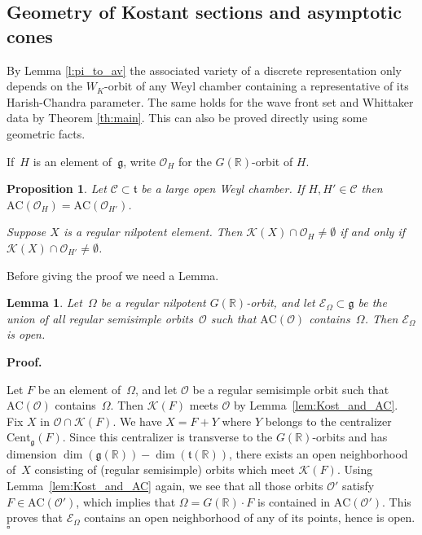 \documentclass[10pt,leqno]{article}
\newtheorem{lemma}[equation]{Lemma}
\newtheorem{proposition}[equation]{Proposition}
\numberwithin{equation}{section}
\newcommand{\qed}{\hfill $\square$ \medskip}
\newenvironment{proof}[1][Proof]{\noindent\textbf{#1.} }{\qed}
\renewcommand{\O}{\mathcal O}
\newcommand{\R}{\mathbb R}
\newcommand{\K}{\mathcal K}
\renewcommand{\t}{\mathfrak t}
\newcommand{\g}{\mathfrak g}
\newcommand{\AC}{\mathrm{AC}}
\newcommand{\Kostant}[1]{\mathcal{K}(#1)}
\begin{document}
\subsection{Geometry of Kostant sections and asymptotic cones}

By Lemma \ref{l:pi_to_av} the associated variety of a discrete representation only depends on the $W_K$-orbit of any Weyl chamber containing a representative of its Harish-Chandra parameter. 
The same holds for the wave front set and Whittaker data by Theorem \ref{th:main}. This can also be proved directly 
using some geometric facts.


If~$H$ is an element of~$\g$, write $\O_H$ for the $G(\R)$-orbit of $H$.

\begin{proposition}\label{prop:AC_chamber} Let $\mathcal{C} \subset \t$ be a large open Weyl chamber.
  If $H,H'\in\mathcal{C}$  then $\AC(\mathcal{O}_H)=\AC(\mathcal{O}_{H'})$.

  Suppose $X$ is a regular nilpotent element. Then $\K(X)\cap \O_H\ne \emptyset$ if and only if $\K(X)\cap \O_{H'}\ne\emptyset$.
\end{proposition}

Before giving the proof we need a Lemma.

\begin{lemma}\label{lem:AC_containment} Let~$\Omega$ be a regular nilpotent $G(\R)$-orbit, and let $\mathcal{E}_\Omega \subset \g$ be the union of all regular semisimple orbits~$\mathcal{O}$ such that $\AC(\mathcal{O})$ contains~$\Omega$. Then $\mathcal{E}_\Omega$ is open. 
\end{lemma}

\begin{proof}

Let $F$ be an element of~$\Omega$, and let $\mathcal{O}$  be a regular semisimple orbit such that $\AC(\mathcal{O})$ contains~$\Omega$.
Then $\Kostant{F}$ meets $\mathcal{O}$ by  Lemma~\ref{lem:Kost_and_AC}. 
Fix $X$ in $\mathcal{O} \cap \Kostant{F}$.
We have $X =F+Y$ where $Y$ belongs to the centralizer $\mathrm{Cent}_\g(F)$.
Since this centralizer is transverse to the $G(\R)$-orbits and has dimension $\dim(\g(\R))-\dim(\t(\R))$,
there exists an open neighborhood of~$X$ consisting of (regular semisimple) orbits  which meet $\Kostant{F}$.
Using Lemma~\ref{lem:Kost_and_AC} again, we see that all those orbits $\mathcal{O}'$ satisfy $F \in \AC(\mathcal{O}')$,
which implies that $\Omega = G(\R) \cdot F$ is contained in $\AC(\mathcal{O}')$.
This proves that $\mathcal{E}_\Omega$ contains an open neighborhood of any of its points, hence is open.   \end{proof}
\end{document}
